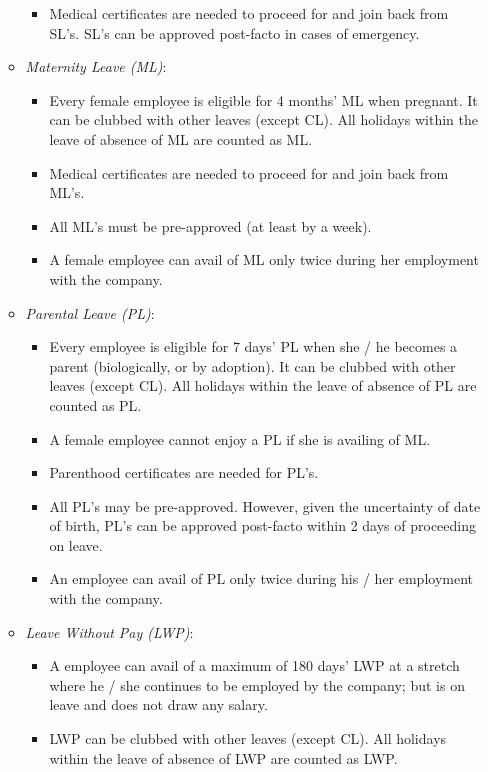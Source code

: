 \documentclass{article}
\begin{document}
\begin{footnotesize}
\begin{enumerate}
\begin{itemize}
\begin{itemize}
\item Medical certificates are needed to proceed for and join back from SL's. SL's can be approved post-facto in cases of emergency.

\end{itemize}

\item {\em Maternity Leave (ML)}: 
\begin{itemize}
\item Every female employee is eligible for 4 months' ML when pregnant. It can be clubbed with other leaves (except CL). All holidays within the leave of absence of ML are counted as ML. 
\item Medical certificates are needed to proceed for and join back from ML's. 
\item All ML's must be pre-approved (at least by a week).
\item A female employee can avail of ML only twice during her employment with the company.
\end{itemize}

\newpage
\item {\em Parental Leave (PL)}: 
\begin{itemize}
\item Every employee is eligible for 7 days' PL when she / he becomes a parent (biologically, or by adoption). It can be clubbed with other leaves (except CL). All holidays within the leave of absence of PL are counted as PL. 
\item A female employee cannot enjoy a PL if she is availing of ML.
\item Parenthood certificates are needed for PL's. 
\item All PL's may be pre-approved. However, given the uncertainty of date of birth, PL's can be approved post-facto within 2 days of proceeding on leave.
\item An employee can avail of PL only twice during his / her employment with the company.
\end{itemize}

\item {\em Leave Without Pay (LWP)}: 
\begin{itemize}
\item A employee can avail of a maximum of 180 days' LWP at a stretch where he / she continues to be employed by the company; but is on leave and does not draw any salary.
\item LWP can be clubbed with other leaves (except CL). All holidays within the leave of absence of LWP are counted as LWP.


\end{itemize}
\end{itemize}
\end{enumerate}
\end{footnotesize}
\end{document}

